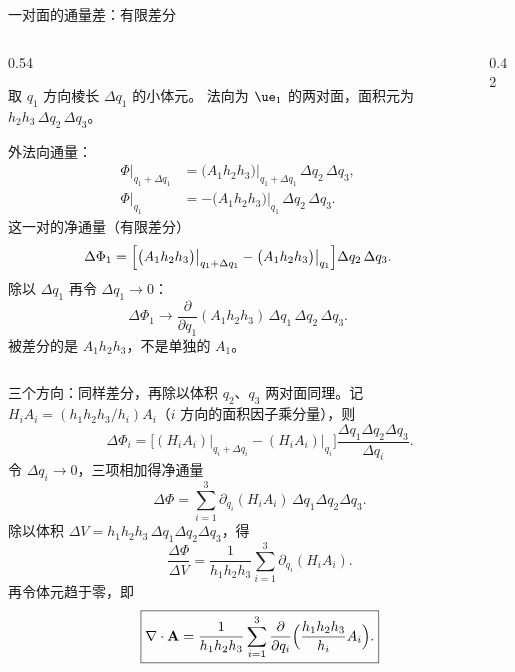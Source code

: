 \documentclass[fontset=windows, chinese, 10pt, xcolor=dvipsnames]{beamer}
\begin{document}
\begin{frame}{一对面的通量差：有限差分}
  \begin{columns}[T]
    \begin{column}{0.54\textwidth}
      {\small
      取 $q_1$ 方向棱长 $\Delta q_1$ 的小体元。
      法向为 $\ue_1$ 的两对面，面积元为 $h_2 h_3\,\Delta q_2\,\Delta q_3$。

      外法向通量：
      \begin{align*}
        \Phi\big|_{q_1+\Delta q_1}
        &= \bigl(A_1 h_2 h_3\bigr)\big|_{q_1+\Delta q_1}
          \,\Delta q_2\,\Delta q_3,\\
        \Phi\big|_{q_1}
        &= -\bigl(A_1 h_2 h_3\bigr)\big|_{q_1}
          \,\Delta q_2\,\Delta q_3.
      \end{align*}
      这一对的净通量（有限差分）
      \begin{equation*}
        \Delta\Phi_1
        =\Bigl[
          \bigl(A_1 h_2 h_3\bigr)\big|_{q_1+\Delta q_1}
          -\bigl(A_1 h_2 h_3\bigr)\big|_{q_1}
        \Bigr]
        \Delta q_2\,\Delta q_3.
      \end{equation*}
      除以 $\Delta q_1$ 再令 $\Delta q_1\to 0$：
      \begin{equation*}
        \Delta\Phi_1
        \to
        \frac{\partial}{\partial q_1}(A_1 h_2 h_3)\,
        \Delta q_1\,\Delta q_2\,\Delta q_3.
      \end{equation*}
      被差分的是 $A_1 h_2 h_3$，不是单独的 $A_1$。}
    \end{column}
    \begin{column}{0.42\textwidth}
      \centering
      \scalebox{0.72}{}
    \end{column}
  \end{columns}
\end{frame}

\begin{frame}{三个方向：同样差分，再除以体积}
  $q_2$、$q_3$ 两对面同理。记
  $H_i A_i=(h_1 h_2 h_3/h_i)A_i$（$i$ 方向的面积因子乘分量），则
  \begin{equation*}
    \Delta\Phi_i
    =\bigl[(H_i A_i)\vert_{q_i+\Delta q_i}
          -(H_i A_i)\vert_{q_i}\bigr]
    \frac{\Delta q_1\Delta q_2\Delta q_3}{\Delta q_i}.
  \end{equation*}
  令 $\Delta q_i\to 0$，三项相加得净通量
  \begin{equation*}
    \Delta\Phi
    =\sum_{i=1}^{3}
      \partial_{q_i}(H_i A_i)\,
      \Delta q_1\Delta q_2\Delta q_3.
  \end{equation*}
  除以体积 $\Delta V=h_1 h_2 h_3\,\Delta q_1\Delta q_2\Delta q_3$，得
  \begin{equation*}
    \frac{\Delta\Phi}{\Delta V}
    =\frac{1}{h_1 h_2 h_3}
      \sum_{i=1}^{3}\partial_{q_i}(H_i A_i).
  \end{equation*}
  再令体元趋于零，即
  \begin{equation*}
    \boxed{\displaystyle
      \nabla\cdot\mathbf{A}
      =\frac{1}{h_1 h_2 h_3}
        \sum_{i=1}^{3}
        \frac{\partial}{\partial q_i}
        \Bigl(\frac{h_1 h_2 h_3}{h_i} A_i\Bigr).}
  \end{equation*}
\end{frame}
\end{document}
